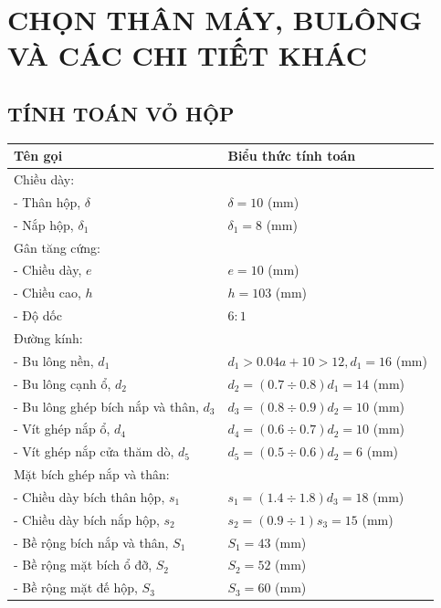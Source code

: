 \chapter{CHỌN THÂN MÁY, BULÔNG VÀ CÁC CHI TIẾT KHÁC}
    \section{TÍNH TOÁN VỎ HỘP}
        \begin{longtable}{|p{7.5cm}|p{8.3cm}|}
            \hline
            \textbf{Tên gọi} & \textbf{Biểu thức tính toán} \\
            \hline
            Chiều dày: & \\
            - Thân hộp, $\delta$ & $\delta = 10$ (mm) \\
            - Nắp hộp, $\delta_1$ & $\delta_1 = 8$ (mm) \\
            \hline
            Gân tăng cứng: & \\
            - Chiều dày, $e$ & $e = 10$ (mm) \\
            - Chiều cao, $h$ & $h = 103$ (mm) \\
            - Độ dốc & $6:1$ \\
            \hline
            Đường kính: & \\
            - Bu lông nền, $d_1$ & $d_1 > 0.04a + 10 > 12, d_1 = 16$ (mm) \\
            - Bu lông cạnh ổ, $d_2$ & $d_2 = (0.7 \div 0.8)d_1 = 14$ (mm) \\
            - Bu lông ghép bích nắp và thân, $d_3$ & $d_3 = (0.8 \div 0.9)d_2 = 10$ (mm) \\
            - Vít ghép nắp ổ, $d_4$ & $d_4 = (0.6 \div 0.7)d_2 = 10$ (mm) \\
            - Vít ghép nắp cửa thăm dò, $d_5$ & $d_5 = (0.5 \div 0.6)d_2 = 6$ (mm) \\
            \hline
            Mặt bích ghép nắp và thân: & \\
            - Chiều dày bích thân hộp, $s_1$ & $s_1 = (1.4 \div 1.8)d_3 = 18$ (mm) \\
            - Chiều dày bích nắp hộp, $s_2$ & $s_2 = (0.9 \div 1)s_3 = 15$ (mm) \\
            - Bề rộng bích nắp và thân, $S_1$ & $S_1 = 43$ (mm) \\
            - Bề rộng mặt bích ổ đỡ, $S_2$ & $S_2 = 52$ (mm) \\
            - Bề rộng mặt đế hộp, $S_3$ & $S_3 = 60$ (mm) \\
            \hline

\end{longtable}
